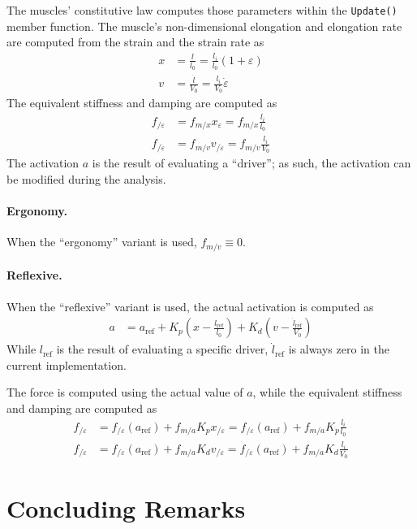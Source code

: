 \documentclass{article}
\begin{document}
The muscles' constitutive law computes those parameters
within the \texttt{Update()} member function.
The muscle's non-dimensional elongation and elongation rate
are computed from the strain and the strain rate as
\begin{subequations}
\begin{align}
	x
	&=
	\frac{l}{l_0}
	=
	\frac{l_i}{l_0}(1 + \varepsilon)
	\\
	v
	&=
	\frac{\dot{l}}{V_0}
	=
	\frac{l_i}{V_0} \dot{\varepsilon}
\end{align}
\end{subequations}
The equivalent stiffness and damping are computed as
\begin{subequations}
\begin{align}
	f_{/\varepsilon}
	&=
	f_{m/x} x_{\varepsilon}
	=
	f_{m/x} \frac{l_i}{l_0}
	\\
	f_{/\dot{\varepsilon}}
	&=
	f_{m/v} v_{/\dot{\varepsilon}}
	=
	f_{m/v} \frac{l_i}{V_0}
\end{align}
\end{subequations}
The activation $a$ is the result of evaluating a ``driver'';
as such, the activation can be modified during the analysis.

\paragraph{Ergonomy.}
When the ``ergonomy'' variant is used, $f_{m/v} \equiv 0$.

\paragraph{Reflexive.}
When the ``reflexive'' variant is used, the actual activation
is computed as
\begin{align}
	a
	&=
	a_\text{ref}
	+
	K_p \left( x - \frac{l_\text{ref}}{l_0} \right)
	+
	K_d \left( v - \frac{\dot{l}_\text{ref}}{V_0} \right)
\end{align}
While $l_\text{ref}$ is the result of evaluating a specific driver,
$\dot{l}_\text{ref}$ is always zero in the current implementation.

The force is computed using the actual value of $a$,
while the equivalent stiffness and damping are computed as
\begin{subequations}
\begin{align}
	f_{/\varepsilon}
	&=
	f_{/\varepsilon}(a_\text{ref})
	+
	f_{m/a} K_p x_{/\varepsilon}
	=
	f_{/\varepsilon}(a_\text{ref})
	+
	f_{m/a} K_p \frac{l_i}{l_0}
	\\
	f_{/\dot{\varepsilon}}
	&=
	f_{/\dot{\varepsilon}}(a_\text{ref})
	+
	f_{m/a} K_d v_{/\dot{\varepsilon}}
	=
	f_{/\dot{\varepsilon}}(a_\text{ref})
	+
	f_{m/a} K_d \frac{l_i}{V_0}
\end{align}
\end{subequations}


\section{Concluding Remarks}




\end{document}
